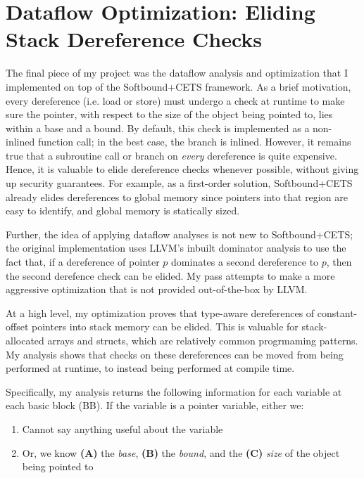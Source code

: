 \documentclass{article}
\begin{document}
\section{Dataflow Optimization: Eliding Stack Dereference Checks}

    The final piece of my project was the dataflow analysis and optimization that
    I implemented on top of the Softbound+CETS framework. As a brief motivation,
    every dereference (i.e. load or store) must undergo a check at runtime to make sure the pointer,
    with respect to the size of the object being pointed to, lies within a
    base and a bound. By default, this check is implemented as a non-inlined
    function call; in the best case, the branch is inlined. However, it remains
    true that a subroutine call or branch on \textit{every} dereference is quite
    expensive. Hence, it is valuable to elide dereference checks whenever possible,
    without giving up security guarantees. For example, as a first-order solution, 
    Softbound+CETS already elides dereferences to global memory since pointers 
    into that region are easy to identify, and global memory is statically sized.

    \bigbreak{}

    Further, the idea of applying dataflow analyses is not new to Softbound+CETS; the
    original implementation uses LLVM's inbuilt dominator analysis to use the fact that,
    if a dereference of pointer $p$ dominates a second dereference to $p$, then
    the second derefence check can be elided. My pass attempts to make a more
    aggressive optimization that is not provided out-of-the-box by LLVM.

    \bigbreak{}

    At a high level, my optimization proves that type-aware dereferences of constant-offset 
    pointers into stack memory can be elided. This is valuable for stack-allocated
    arrays and structs, which are relatively common progrmaming patterns.
    My analysis shows that checks on these dereferences can be moved from
    being performed at runtime, to instead being performed at compile time.

    \bigbreak{}

    Specifically, my analysis returns the following information for each variable
    at each basic block (BB). If the variable is a pointer variable, either we:
    \begin{enumerate}[label=\textbf{\arabic*}]
        \item Cannot say anything useful about the variable
        \item Or, we know \textbf{(A)} the \textit{base}, \textbf{(B)} the \textit{bound}, and the \textbf{(C)} \textit{size} of the object being pointed to
    \end{enumerate}
\end{document}
